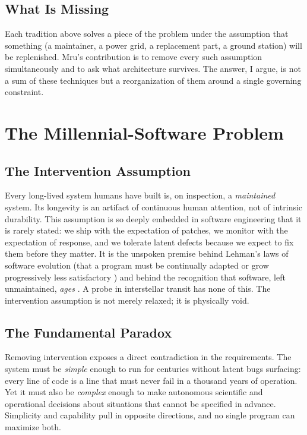 \documentclass[10pt, a4paper]{article}
\begin{document}
\subsection{What Is Missing}

Each tradition above solves a piece of the problem under the assumption that something (a maintainer, a power grid, a replacement part, a ground station) will be replenished. Mru's contribution is to remove every such assumption simultaneously and to ask what architecture survives. The answer, I argue, is not a sum of these techniques but a reorganization of them around a single governing constraint.

\section{The Millennial-Software Problem}

\subsection{The Intervention Assumption}

Every long-lived system humans have built is, on inspection, a \textit{maintained} system. Its longevity is an artifact of continuous human attention, not of intrinsic durability. This assumption is so deeply embedded in software engineering that it is rarely stated: we ship with the expectation of patches, we monitor with the expectation of response, and we tolerate latent defects because we expect to fix them before they matter. It is the unspoken premise behind Lehman's laws of software evolution (that a program must be continually adapted or grow progressively less satisfactory \cite{lehman1980}) and behind the recognition that software, left unmaintained, \textit{ages} \cite{parnas1994}. A probe in interstellar transit has none of this. The intervention assumption is not merely relaxed; it is physically void.

\subsection{The Fundamental Paradox}

Removing intervention exposes a direct contradiction in the requirements. The system must be \textit{simple} enough to run for centuries without latent bugs surfacing: every line of code is a line that must never fail in a thousand years of operation. Yet it must also be \textit{complex} enough to make autonomous scientific and operational decisions about situations that cannot be specified in advance. Simplicity and capability pull in opposite directions, and no single program can maximize both.
\end{document}
